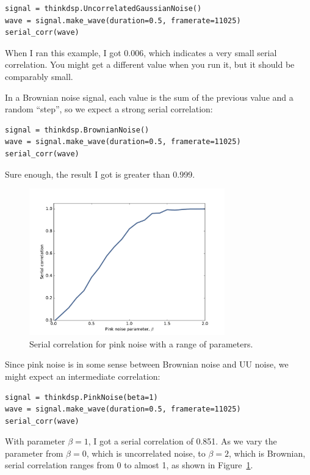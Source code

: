 \documentclass[12pt]{book}
\begin{document}
\begin{verbatim}
signal = thinkdsp.UncorrelatedGaussianNoise()
wave = signal.make_wave(duration=0.5, framerate=11025)
serial_corr(wave)
\end{verbatim}

When I ran this example, I got 0.006, which indicates a very
small serial correlation.  You might get a different value when you run
it, but it should be comparably small.

In a Brownian noise signal, each value is the sum of the previous
value and a random ``step'', so we expect a strong serial
correlation:

\begin{verbatim}
signal = thinkdsp.BrownianNoise()
wave = signal.make_wave(duration=0.5, framerate=11025)
serial_corr(wave)
\end{verbatim}

Sure enough, the result I got is greater than 0.999.

\begin{figure}
\centerline{\includegraphics[height=2.5in]{figs/autocorr3.pdf}}
\caption{Serial correlation for pink noise with a range of
parameters.}
\label{fig.autocorr3}
\end{figure}

Since pink noise is in some sense between Brownian noise and UU noise,
we might expect an intermediate correlation:

\begin{verbatim}
signal = thinkdsp.PinkNoise(beta=1)
wave = signal.make_wave(duration=0.5, framerate=11025)
serial_corr(wave)
\end{verbatim}

With parameter $\beta=1$, I got a serial correlation of 0.851.
As we vary the parameter from $\beta=0$, which is uncorrelated
noise, to $\beta=2$, which is Brownian, serial correlation
ranges from 0 to almost 1, as shown in Figure~\ref{fig.autocorr3}.
\end{document}
